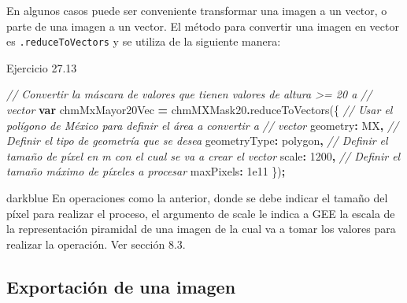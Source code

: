 \documentclass[
  12pt,
  letterpaper,
  twoside]{book}
\newenvironment{Shaded}{\begin{snugshade}}{\end{snugshade}}
\newcommand{\CommentTok}[1]{\textcolor[rgb]{0.56,0.35,0.01}{\textit{#1}}}
\newcommand{\DataTypeTok}[1]{\textcolor[rgb]{0.13,0.29,0.53}{#1}}
\newcommand{\DecValTok}[1]{\textcolor[rgb]{0.00,0.00,0.81}{#1}}
\newcommand{\FloatTok}[1]{\textcolor[rgb]{0.00,0.00,0.81}{#1}}
\newcommand{\FunctionTok}[1]{\textcolor[rgb]{0.00,0.00,0.00}{#1}}
\newcommand{\KeywordTok}[1]{\textcolor[rgb]{0.13,0.29,0.53}{\textbf{#1}}}
\newcommand{\NormalTok}[1]{#1}
\newcommand{\OperatorTok}[1]{\textcolor[rgb]{0.81,0.36,0.00}{\textbf{#1}}}
\newcommand{\StringTok}[1]{\textcolor[rgb]{0.31,0.60,0.02}{#1}}
\begin{document}
En algunos casos puede ser conveniente transformar una imagen a un vector, o parte de una imagen a un vector. El método para convertir una imagen en vector es \texttt{.reduceToVectors} y se utiliza de la siguiente manera:

Ejercicio 27.13

\begin{Shaded}
\begin{Highlighting}[]
\CommentTok{// Convertir la máscara de valores que tienen valores de altura \textgreater{}= 20 a }
\CommentTok{// vector}
\KeywordTok{var}\NormalTok{ chmMxMayor20Vec }\OperatorTok{=}\NormalTok{ chmMXMask20}\OperatorTok{.}\FunctionTok{reduceToVectors}\NormalTok{(\{}
     \CommentTok{// Usar el polígono de México para definir el área a convertir a }
     \CommentTok{// vector}
  \DataTypeTok{geometry}\OperatorTok{:}\NormalTok{ MX}\OperatorTok{,}
\CommentTok{// Definir el tipo de geometría que se desea}
  \DataTypeTok{geometryType}\OperatorTok{:} \StringTok{\textquotesingle{}polygon\textquotesingle{}}\OperatorTok{,}
\CommentTok{// Definir el tamaño de píxel en m con el cual se va a crear el vector}
  \DataTypeTok{scale}\OperatorTok{:} \DecValTok{1200}\OperatorTok{,}
\CommentTok{// Definir el tamaño máximo de píxeles a procesar}
  \DataTypeTok{maxPixels}\OperatorTok{:} \FloatTok{1e11}
\NormalTok{\})}\OperatorTok{;}
\end{Highlighting}
\end{Shaded}

\begin{bluebox2}

\begin{awesomeblock}{5pt}{\faLightbulb}{darkblue}
En operaciones como la anterior, donde se debe indicar el tamaño del píxel para realizar el proceso, el argumento de scale le indica a GEE la escala de la representación piramidal de una imagen de la cual va a tomar los valores para realizar la operación. Ver sección 8.3.

\end{awesomeblock}

\end{bluebox2}

\hypertarget{exportaciuxf3n-de-una-imagen}{%
\subsection{Exportación de una imagen}\label{exportaciuxf3n-de-una-imagen}}
\end{document}
